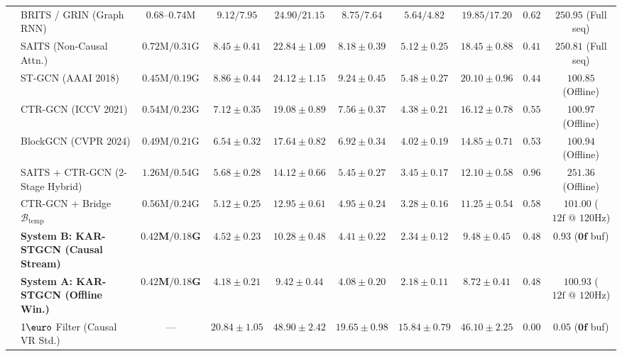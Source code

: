 \documentclass[10pt,twocolumn]{article}
\begin{document}
\begin{table}[!t]
{\begin{tabular}{llcccccccc}
& BRITS \cite{cao2018brits} / GRIN \cite{cini2022filling} (Graph RNN) & $0.68\text{--}0.74\text{M}$ & $9.12 / 7.95$ & $24.90 / 21.15$ & $8.75 / 7.64$ & $5.64 / 4.82$ & $19.85 / 17.20$ & $0.62$ & $250.95$ (Full seq) \\
& SAITS \cite{du2023saits} (Non-Causal Attn.) & $0.72\text{M} / 0.31\text{G}$ & $8.45 \pm 0.41$ & $22.84 \pm 1.09$ & $8.18 \pm 0.39$ & $5.12 \pm 0.25$ & $18.45 \pm 0.88$ & $0.41$ & $250.81$ (Full seq) \\
& ST-GCN \cite{yan2018spatial} (AAAI 2018) & $0.45\text{M} / 0.19\text{G}$ & $8.86 \pm 0.44$ & $24.12 \pm 1.15$ & $9.24 \pm 0.45$ & $5.48 \pm 0.27$ & $20.10 \pm 0.96$ & $0.44$ & $100.85$ (Offline) \\
& CTR-GCN \cite{chen2021channel} (ICCV 2021) & $0.54\text{M} / 0.23\text{G}$ & $7.12 \pm 0.35$ & $19.08 \pm 0.89$ & $7.56 \pm 0.37$ & $4.38 \pm 0.21$ & $16.12 \pm 0.78$ & $0.55$ & $100.97$ (Offline) \\
& BlockGCN \cite{zhou2024blockgcn} (CVPR 2024) & $0.49\text{M} / 0.21\text{G}$ & $6.54 \pm 0.32$ & $17.64 \pm 0.82$ & $6.92 \pm 0.34$ & $4.02 \pm 0.19$ & $14.85 \pm 0.71$ & $0.53$ & $100.94$ (Offline) \\
& SAITS + CTR-GCN (2-Stage Hybrid) & $1.26\text{M} / 0.54\text{G}$ & $5.68 \pm 0.28$ & $14.12 \pm 0.66$ & $5.45 \pm 0.27$ & $3.45 \pm 0.17$ & $12.10 \pm 0.58$ & $0.96$ & $251.36$ (Offline) \\
& CTR-GCN + Bridge $\mathcal{B}_{\text{temp}}$ & $0.56\text{M} / 0.24\text{G}$ & $5.12 \pm 0.25$ & $12.95 \pm 0.61$ & $4.95 \pm 0.24$ & $3.28 \pm 0.16$ & $11.25 \pm 0.54$ & $0.58$ & $101.00$ ($12\text{f @ 120Hz}$) \\
& \textbf{System B: KAR-STGCN (Causal Stream)} & $\mathbf{0.42\text{M} / 0.18\text{G}}$ & $4.52 \pm 0.23$ & $10.28 \pm 0.48$ & $4.41 \pm 0.22$ & $2.34 \pm 0.12$ & $9.48 \pm 0.45$ & $0.48$ & $\mathbf{0.93}$ ($\mathbf{0\text{f}}$ buf) \\
& \textbf{System A: KAR-STGCN (Offline Win.)} & $\mathbf{0.42\text{M} / 0.18\text{G}}$ & $\mathbf{4.18 \pm 0.21}$ & $\mathbf{9.42 \pm 0.44}$ & $\mathbf{4.08 \pm 0.20}$ & $\mathbf{2.18 \pm 0.11}$ & $\mathbf{8.72 \pm 0.41}$ & $0.48$ & $100.93$ ($12\text{f @ 120Hz}$) \\
\midrule
{}
& $1\text{\euro}$ Filter \cite{casiez20121euro} (Causal VR Std.) & --- & $20.84 \pm 1.05$ & $48.90 \pm 2.42$ & $19.65 \pm 0.98$ & $15.84 \pm 0.79$ & $46.10 \pm 2.25$ & $0.00$ & $\mathbf{0.05}$ ($\mathbf{0\text{f}}$ buf) \\

\end{tabular}}
\end{table}
\end{document}
